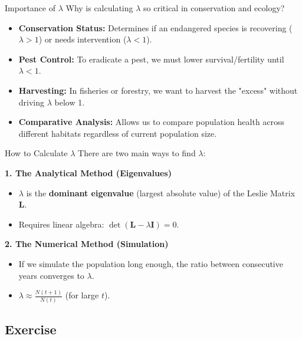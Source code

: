 \begin{frame}{Importance of $\lambda$}
    Why is calculating $\lambda$ so critical in conservation and ecology?
    \vspace{1em}
    \begin{itemize}
        \item \textbf{Conservation Status:} Determines if an endangered species is recovering ($\lambda > 1$) or needs intervention ($\lambda < 1$).
        \item \textbf{Pest Control:} To eradicate a pest, we must lower survival/fertility until $\lambda < 1$.
        \item \textbf{Harvesting:} In fisheries or forestry, we want to harvest the "excess" without driving $\lambda$ below 1.
        \item \textbf{Comparative Analysis:} Allows us to compare population health across different habitats regardless of current population size.
    \end{itemize}
\end{frame}

\begin{frame}{How to Calculate $\lambda$}
    There are two main ways to find $\lambda$:
    
    \vspace{1em}
    \textbf{1. The Analytical Method (Eigenvalues)}
    \begin{itemize}
        \item $\lambda$ is the \textbf{dominant eigenvalue} (largest absolute value) of the Leslie Matrix $\mathbf{L}$.
        \item Requires linear algebra: $\det(\mathbf{L} - \lambda \mathbf{I}) = 0$.
    \end{itemize}
    
    \vspace{1em}
    \textbf{2. The Numerical Method (Simulation)}
    \begin{itemize}
        \item If we simulate the population long enough, the ratio between consecutive years converges to $\lambda$.
        \item $\lambda \approx \frac{N(t+1)}{N(t)}$ (for large $t$).
    \end{itemize}
\end{frame}


\subsection{Exercise}

